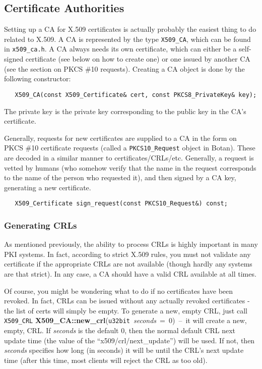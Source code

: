 \documentclass{article}
\newcommand{\filename}[1]{\texttt{#1}}
\newcommand{\function}[1]{\textbf{#1}}
\newcommand{\type}[1]{\texttt{#1}}
\renewcommand{\arg}[1]{\textsl{#1}}
\begin{document}
\subsection{Certificate Authorities}

Setting up a CA for X.509 certificates is actually probably the easiest thing
to do related to X.509. A CA is represented by the type \type{X509\_CA}, which
can be found in \filename{x509\_ca.h}. A CA always needs its own certificate,
which can either be a self-signed certificate (see below on how to create one)
or one issued by another CA (see the section on PKCS \#10 requests). Creating
a CA object is done by the following constructor:

\begin{verbatim}
   X509_CA(const X509_Certificate& cert, const PKCS8_PrivateKey& key);
\end{verbatim}

The private key is the private key corresponding to the public key in the
CA's certificate.

Generally, requests for new certificates are supplied to a CA in the form on
PKCS \#10 certificate requests (called a \type{PKCS10\_Request} object in
Botan). These are decoded in a similar manner to
certificates/CRLs/etc. Generally, a request is vetted by humans (who somehow
verify that the name in the request corresponds to the name of the person who
requested it), and then signed by a CA key, generating a new certificate.

\begin{verbatim}
   X509_Certificate sign_request(const PKCS10_Request&) const;
\end{verbatim}

\subsubsection{Generating CRLs}

As mentioned previously, the ability to process CRLs is highly important in
many PKI systems. In fact, according to strict X.509 rules, you must not
validate any certificate if the appropriate CRLs are not available (though
hardly any systems are that strict). In any case, a CA should have a valid CRL
available at all times.

Of course, you might be wondering what to do if no certificates have been
revoked. In fact, CRLs can be issued without any actually revoked certificates
- the list of certs will simply be empty. To generate a new, empty CRL, just
call \type{X509\_CRL}
\function{X509\_CA::new\_crl}(\type{u32bit}~\arg{seconds}~=~0)~--~it will
create a new, empty, CRL. If \arg{seconds} is the default 0, then the normal
default CRL next update time (the value of the ``x509/crl/next\_update'') will
be used. If not, then \arg{seconds} specifies how long (in seconds) it will be
until the CRL's next update time (after this time, most clients will reject the
CRL as too old).
\end{document}
